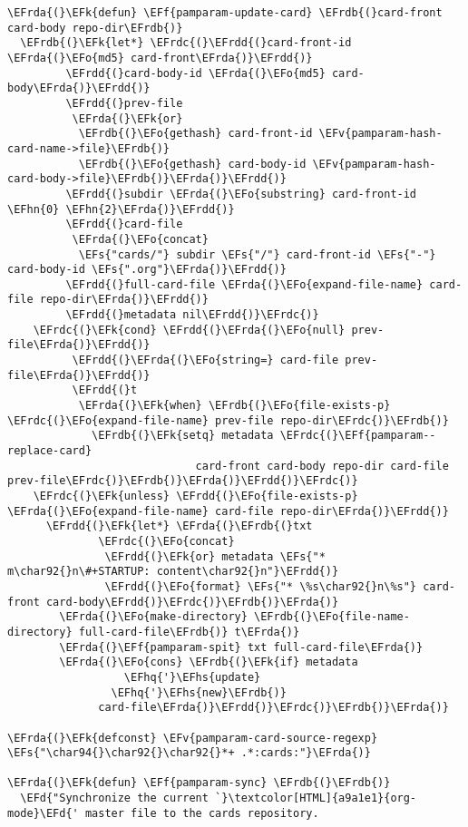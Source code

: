 \documentclass[a4wide,10pt]{article}
\newcommand{\EFs}[1]{\textcolor{EFs}{#1}} %
\newcommand{\EFd}[1]{\textcolor{EFd}{#1}} %
\newcommand{\EFk}[1]{\textcolor{EFk}{#1}} %
\newcommand{\EFf}[1]{\textcolor{EFf}{#1}} %
\newcommand{\EFv}[1]{\textcolor{EFv}{#1}} %
\newcommand{\EFo}[1]{\textcolor{EFo}{#1}} %
\newcommand{\EFhn}[1]{\textcolor{EFhn}{\textbf{#1}}} %
\newcommand{\EFhq}[1]{\textcolor{EFhq}{#1}} %
\newcommand{\EFhs}[1]{\textcolor{EFhs}{#1}} %
\newcommand{\EFrda}[1]{\textcolor{EFrda}{#1}} %
\newcommand{\EFrdb}[1]{\textcolor{EFrdb}{#1}} %
\newcommand{\EFrdc}[1]{\textcolor{EFrdc}{#1}} %
\newcommand{\EFrdd}[1]{\textcolor{EFrdd}{#1}} %
\begin{document}
\begin{Code}
\begin{Verbatim}
\EFrda{(}\EFk{defun} \EFf{pamparam-update-card} \EFrdb{(}card-front card-body repo-dir\EFrdb{)}
  \EFrdb{(}\EFk{let*} \EFrdc{(}\EFrdd{(}card-front-id \EFrda{(}\EFo{md5} card-front\EFrda{)}\EFrdd{)}
         \EFrdd{(}card-body-id \EFrda{(}\EFo{md5} card-body\EFrda{)}\EFrdd{)}
         \EFrdd{(}prev-file
          \EFrda{(}\EFk{or}
           \EFrdb{(}\EFo{gethash} card-front-id \EFv{pamparam-hash-card-name->file}\EFrdb{)}
           \EFrdb{(}\EFo{gethash} card-body-id \EFv{pamparam-hash-card-body->file}\EFrdb{)}\EFrda{)}\EFrdd{)}
         \EFrdd{(}subdir \EFrda{(}\EFo{substring} card-front-id \EFhn{0} \EFhn{2}\EFrda{)}\EFrdd{)}
         \EFrdd{(}card-file
          \EFrda{(}\EFo{concat}
           \EFs{"cards/"} subdir \EFs{"/"} card-front-id \EFs{"-"} card-body-id \EFs{".org"}\EFrda{)}\EFrdd{)}
         \EFrdd{(}full-card-file \EFrda{(}\EFo{expand-file-name} card-file repo-dir\EFrda{)}\EFrdd{)}
         \EFrdd{(}metadata nil\EFrdd{)}\EFrdc{)}
    \EFrdc{(}\EFk{cond} \EFrdd{(}\EFrda{(}\EFo{null} prev-file\EFrda{)}\EFrdd{)}
          \EFrdd{(}\EFrda{(}\EFo{string=} card-file prev-file\EFrda{)}\EFrdd{)}
          \EFrdd{(}t
           \EFrda{(}\EFk{when} \EFrdb{(}\EFo{file-exists-p} \EFrdc{(}\EFo{expand-file-name} prev-file repo-dir\EFrdc{)}\EFrdb{)}
             \EFrdb{(}\EFk{setq} metadata \EFrdc{(}\EFf{pamparam--replace-card}
                             card-front card-body repo-dir card-file prev-file\EFrdc{)}\EFrdb{)}\EFrda{)}\EFrdd{)}\EFrdc{)}
    \EFrdc{(}\EFk{unless} \EFrdd{(}\EFo{file-exists-p} \EFrda{(}\EFo{expand-file-name} card-file repo-dir\EFrda{)}\EFrdd{)}
      \EFrdd{(}\EFk{let*} \EFrda{(}\EFrdb{(}txt
              \EFrdc{(}\EFo{concat}
               \EFrdd{(}\EFk{or} metadata \EFs{"* m\char92{}n\#+STARTUP: content\char92{}n"}\EFrdd{)}
               \EFrdd{(}\EFo{format} \EFs{"* \%s\char92{}n\%s"} card-front card-body\EFrdd{)}\EFrdc{)}\EFrdb{)}\EFrda{)}
        \EFrda{(}\EFo{make-directory} \EFrdb{(}\EFo{file-name-directory} full-card-file\EFrdb{)} t\EFrda{)}
        \EFrda{(}\EFf{pamparam-spit} txt full-card-file\EFrda{)}
        \EFrda{(}\EFo{cons} \EFrdb{(}\EFk{if} metadata
                  \EFhq{'}\EFhs{update}
                \EFhq{'}\EFhs{new}\EFrdb{)}
              card-file\EFrda{)}\EFrdd{)}\EFrdc{)}\EFrdb{)}\EFrda{)}

\EFrda{(}\EFk{defconst} \EFv{pamparam-card-source-regexp} \EFs{"\char94{}\char92{}\char92{}*+ .*:cards:"}\EFrda{)}

\EFrda{(}\EFk{defun} \EFf{pamparam-sync} \EFrdb{(}\EFrdb{)}
  \EFd{"Synchronize the current `}\textcolor[HTML]{a9a1e1}{org-mode}\EFd{' master file to the cards repository.


\end{Verbatim}
\end{Code}
\end{document}
